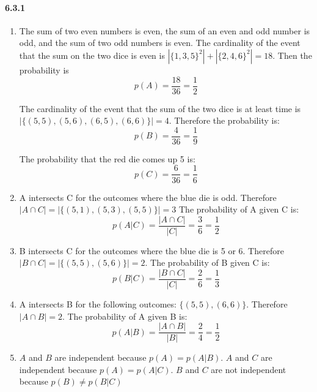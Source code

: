 \documentclass[11pt, letterpaper, twocolumn, fleqn]{article}
\begin{document}
\paragraph{6.3.1}
\begin{enumerate}
  \item The sum of two even numbers is even, the sum of an even and odd number is odd, and the sum of two odd numbers is even. The cardinality of the event that the sum on the two dice is even is $|\{1,3,5\}^2| + |\{2,4,6\}^2| = 18$. Then the probability is 
    $$p(A) = \frac{18}{36} = \frac{1}{2}$$
    
  The cardinality of the event that the sum of the two dice is at least time is $|\{(5,5),(5,6),(6,5),(6,6)\}| = 4$. Therefore the probability is:
    $$p(B) = \frac{4}{36} = \frac{1}{9}$$
    
  The probability that the red die comes up 5 is:
    $$p(C) = \frac{6}{36} = \frac{1}{6}$$
    
  \item A intersects C for the outcomes where the blue die is odd. Therefore $|A \cap C| = |\{(5,1),(5,3),(5,5)\}| = 3$ The probability of A given C is: 
    $$p(A|C) = \frac{|A \cap C|}{|C|} = \frac{3}{6} = \frac{1}{2}$$
    
  \item B intersects C for the outcomes where the blue die is 5 or 6. Therefore $|B \cap C| = |\{(5,5),(5,6)\}| = 2$. The probability of B given C is:
    $$p(B|C) = \frac{|B \cap C|}{|C|} = \frac{2}{6} = \frac{1}{3}$$
    
  \item A intersects B for the following outcomes: $\{(5,5),(6,6)\}$. Therefore $|A \cap B| = 2$. The probability of A given B is:
    $$p(A|B) = \frac{|A \cap B|}{|B|} = \frac{2}{4} = \frac{1}{2}$$
    
  \item $A$ and $B$ are independent because $p(A) = p(A|B)$. $A$ and $C$ are independent because $p(A) = p(A|C)$. $B$ and $C$ are not independent because $p(B) \neq p(B|C)$
\end{enumerate}
\end{document}
